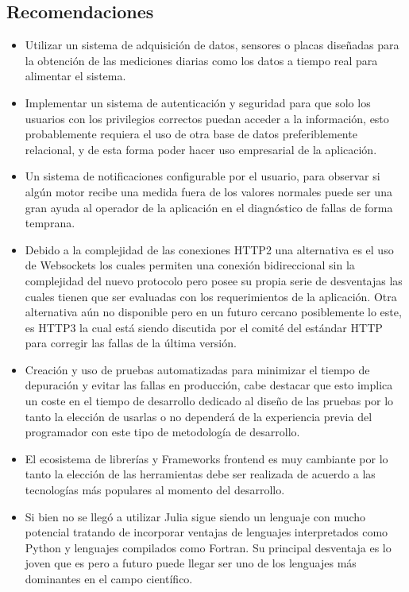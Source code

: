 \subsection{Recomendaciones}
\begin{itemize}
    \item Utilizar un sistema de adquisición de datos, sensores o placas diseñadas
        para la obtención de las mediciones diarias como los datos a tiempo
        real para alimentar el sistema.

    \item  Implementar un sistema de autenticación y seguridad para que solo
        los usuarios con los
        privilegios correctos puedan acceder a la información, esto
        probablemente requiera el uso de otra base de datos preferiblemente
        relacional, y de esta forma poder hacer uso empresarial
        de la aplicación.

    \item Un sistema de notificaciones configurable por el usuario, para
        observar si algún motor recibe una medida fuera de los valores normales
        puede ser una gran ayuda al operador de la aplicación en el diagnóstico
        de fallas de forma temprana.

    \item Debido a la complejidad de las conexiones HTTP2 una alternativa es el
        uso de Websockets los cuales permiten una conexión bidireccional sin la
        complejidad del nuevo protocolo pero posee su propia serie de
        desventajas las cuales tienen que ser evaluadas con los requerimientos
        de la aplicación. Otra alternativa aún no disponible pero en un futuro
        cercano posiblemente lo este, es HTTP3 la cual está siendo discutida
        por el comité del estándar HTTP para corregir las fallas de la última
        versión.

    \item Creación y uso de  pruebas automatizadas para minimizar el tiempo de
        depuración y evitar las fallas en producción, cabe destacar que esto
        implica un coste
        en el tiempo de desarrollo dedicado al diseño de las pruebas por lo
        tanto la elección de usarlas o no dependerá de la experiencia previa
        del programador con este tipo de metodología de desarrollo.

    \item El ecosistema de librerías y Frameworks frontend es muy cambiante por
        lo tanto la elección de las herramientas debe ser realizada de acuerdo
        a las tecnologías más populares al momento del desarrollo.

    \item  Si bien no se llegó a utilizar Julia sigue siendo un lenguaje con
        mucho potencial tratando de incorporar ventajas de lenguajes
        interpretados como Python y lenguajes compilados como Fortran. Su
        principal desventaja es lo joven que es pero a futuro puede llegar ser
        uno de los lenguajes más dominantes en el campo científico.

\end{itemize}
